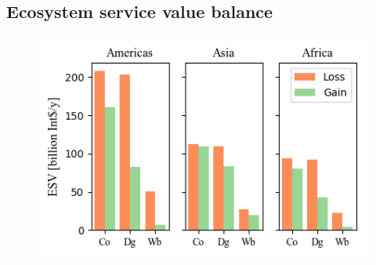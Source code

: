     \subsection{Ecosystem service value balance}
	    \begin{figure}[ht]
		    \centering
		    \includegraphics[scale=1]{img/esv}
		    \caption[Ecosystem service values]{}
		    \label{fig:esv}
	    \end{figure}
